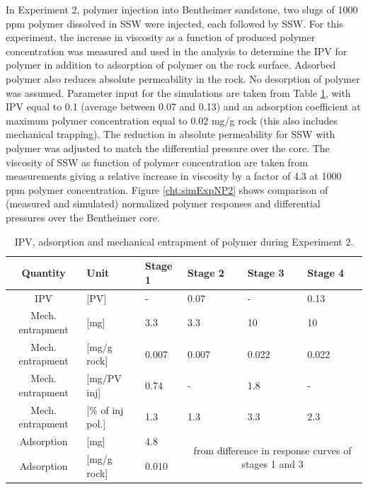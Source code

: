 \documentclass[energies,article,submit,moreauthors,pdftex]{Definitions/mdpi}
\begin{document}
In Experiment 2, polymer injection into Bentheimer sandstone, two slugs of 1000 ppm polymer dissolved in SSW were injected, each followed by SSW. For this experiment, the increase in viscosity as a function of produced polymer concentration was measured and used in the analysis to determine the IPV for polymer in addition to adsorption of polymer on the rock surface. Adsorbed polymer also reduces absolute permeability in the rock. No desorption of polymer was assumed. Parameter input for the simulations are taken from Table \ref{tab:ipvexp2}, with IPV equal to 0.1 (average between 0.07 and 0.13) and an adsorption coefficient at maximum polymer concentration equal to 0.02 mg/g rock (this also includes mechanical trapping). The reduction in absolute permeability for SSW with polymer was adjusted to match the differential pressure over the core. The viscosity of SSW as function of polymer concentration are taken from measurements giving a relative increase in viscosity by a factor of 4.3 at 1000 ppm polymer concentration. Figure \ref{cht:simExpNP2} shows comparison of (measured and simulated) normalized polymer responses and differential pressures over the Bentheimer core.

\begin{table}[h!] 
\small
\centering
\caption{IPV, adsorption and mechanical entrapment of polymer during Experiment 2.}
\label{tab:ipvexp2}
\begin{tabular}{c l l l l l } 
\toprule
\textbf{Quantity} & \textbf{Unit} & \textbf{Stage 1} & \textbf{Stage 2} & \textbf{Stage 3} & \textbf{Stage 4} \\ 
\midrule 
IPV                & [PV]           & -         & 0.07     & -         & 0.13     \\
Mech. entrapment   & [mg]          & 3.3       & 3.3       & 10       & 10       \\ 
Mech. entrapment   & [mg/g rock]   & 0.007     & 0.007     & 0.022     & 0.022     \\ 
Mech. entrapment   & [mg/PV inj]   & 0.74      & -         & 1.8      & -         \\
Mech. entrapment   & [\% of inj pol.]& 1.3       & 1.3       & 3.3       & 2.3       \\ 
Adsorption         & [mg]          & 4.8       &   \multicolumn{3}{c}{\multirow{2}{15em}{from difference in response curves of stages 1 and 3}}        \\
Adsorption         & [mg/g rock]   & 0.010      &  \multicolumn{3}{c}{}    \\ 
\bottomrule
\end{tabular}
\end{table}
\end{document}
